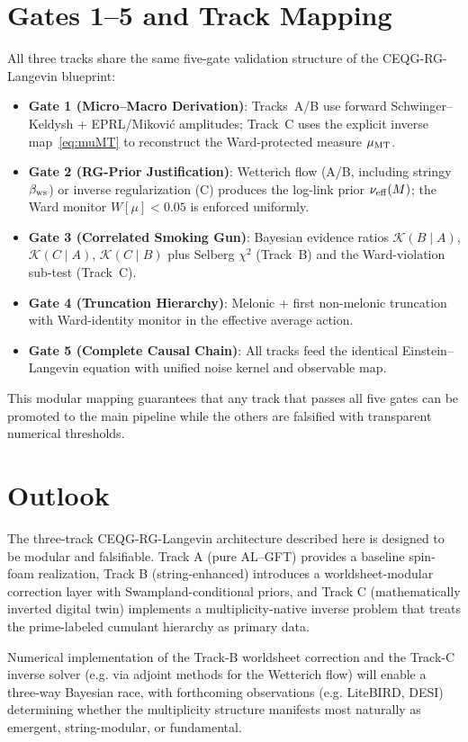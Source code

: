 \documentclass[11pt]{article}
\begin{document}
\section{Gates 1--5 and Track Mapping}
All three tracks share the same five-gate validation structure of the CEQG-RG-Langevin blueprint:
\begin{itemize}
\item \textbf{Gate 1 (Micro--Macro Derivation)}: Tracks~A/B use forward Schwinger--Keldysh + EPRL/Mikovi\'c amplitudes; Track~C uses the explicit inverse map~\eqref{eq:muMT} to reconstruct the Ward-protected measure $\mu_{\rm MT}$.
\item \textbf{Gate 2 (RG-Prior Justification)}: Wetterich flow (A/B, including stringy $\beta_{\rm ws}$) or inverse regularization (C) produces the log-link prior $\nu_{\rm eff}(M)$; the Ward monitor $W[\mu]<0.05$ is enforced uniformly.
\item \textbf{Gate 3 (Correlated Smoking Gun)}: Bayesian evidence ratios $\mathcal{K}(B\mid A)$, $\mathcal{K}(C\mid A)$, $\mathcal{K}(C\mid B)$ plus Selberg $\chi^2$ (Track~B) and the Ward-violation sub-test (Track~C).
\item \textbf{Gate 4 (Truncation Hierarchy)}: Melonic + first non-melonic truncation with Ward-identity monitor in the effective average action.
\item \textbf{Gate 5 (Complete Causal Chain)}: All tracks feed the identical Einstein--Langevin equation with unified noise kernel and observable map.
\end{itemize}
This modular mapping guarantees that any track that passes all five gates can be promoted to the main pipeline while the others are falsified with transparent numerical thresholds.

\section{Outlook}

The three-track CEQG-RG-Langevin architecture described here is designed to be modular and falsifiable. Track A (pure AL--GFT) provides a baseline spin-foam realization, Track B (string-enhanced) introduces a worldsheet-modular correction layer with Swampland-conditional priors, and Track C (mathematically inverted digital twin) implements a multiplicity-native inverse problem that treats the prime-labeled cumulant hierarchy as primary data.

Numerical implementation of the Track-B worldsheet correction and the Track-C inverse solver (e.g. via adjoint methods for the Wetterich flow) will enable a three-way Bayesian race, with forthcoming observations (e.g. LiteBIRD, DESI) determining whether the multiplicity structure manifests most naturally as emergent, string-modular, or fundamental.
\end{document}
